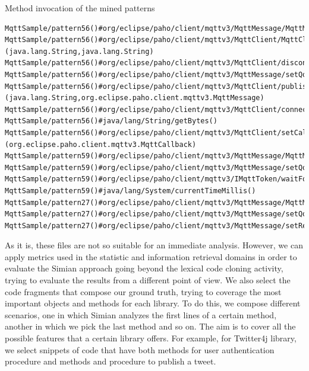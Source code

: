 \vspace{5mm}
\noindent
Method invocation of the mined patterns
\begin{lstlisting}
MqttSample/pattern56()#org/eclipse/paho/client/mqttv3/MqttMessage/MqttMessage(byte[])
MqttSample/pattern56()#org/eclipse/paho/client/mqttv3/MqttClient/MqttClient
(java.lang.String,java.lang.String)
MqttSample/pattern56()#org/eclipse/paho/client/mqttv3/MqttClient/disconnect()
MqttSample/pattern56()#org/eclipse/paho/client/mqttv3/MqttMessage/setQos(int)
MqttSample/pattern56()#org/eclipse/paho/client/mqttv3/MqttClient/publish
(java.lang.String,org.eclipse.paho.client.mqttv3.MqttMessage)
MqttSample/pattern56()#org/eclipse/paho/client/mqttv3/MqttClient/connect()
MqttSample/pattern56()#java/lang/String/getBytes()
MqttSample/pattern56()#org/eclipse/paho/client/mqttv3/MqttClient/setCallback
(org.eclipse.paho.client.mqttv3.MqttCallback)
MqttSample/pattern59()#org/eclipse/paho/client/mqttv3/MqttMessage/MqttMessage(byte[])
MqttSample/pattern59()#org/eclipse/paho/client/mqttv3/MqttMessage/setQos(int)
MqttSample/pattern59()#org/eclipse/paho/client/mqttv3/IMqttToken/waitForCompletion()
MqttSample/pattern59()#java/lang/System/currentTimeMillis()
MqttSample/pattern27()#org/eclipse/paho/client/mqttv3/MqttMessage/MqttMessage(byte[])
MqttSample/pattern27()#org/eclipse/paho/client/mqttv3/MqttMessage/setQos(int)
MqttSample/pattern27()#org/eclipse/paho/client/mqttv3/MqttMessage/setRetained(boolean)

\end{lstlisting}
As it is, these files are not so suitable for an immediate analysis. However, we can apply metrics used in the statistic and information retrieval domains in order to evaluate the Simian approach going beyond the lexical code cloning activity, trying to evaluate the results from a different point of view.
We also select the code fragments that compose our ground truth, trying to coverage the most important objects and methods for each library. To do this, we compose different scenarios, one in which Simian analyzes the first lines of a certain method, another in which we pick the last method and so on. The aim is to cover all the possible features that a certain library offers. For example, for Twitter4j library, we select snippets of code that have both methods for user authentication procedure and methods and procedure to publish a tweet.
